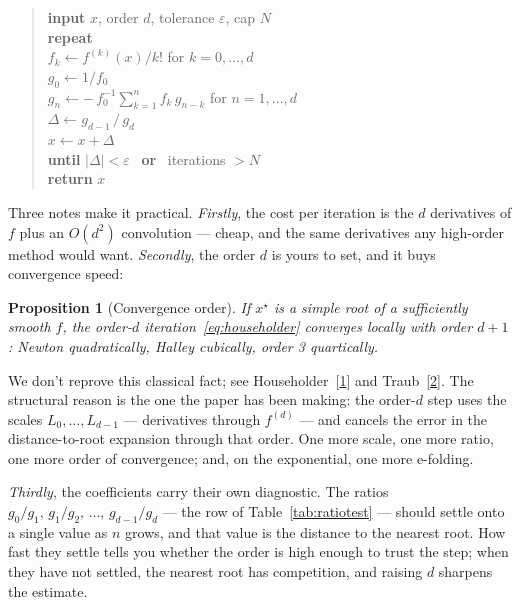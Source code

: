 \documentclass[11pt]{article}
\newtheorem{proposition}{Proposition}
\newcommand{\Lk}[1]{L_{#1}}             %
\newcommand{\order}{d}                  %
\begin{document}
\begin{quote}
\ttfamily
\textbf{input} $x$, order $\order$, tolerance $\varepsilon$, cap $N$\\[0.3em]
\textbf{repeat}\\
\hspace*{1.5em}$f_k \gets f^{(k)}(x)/k!$ \quad for $k=0,\dots,\order$\\
\hspace*{1.5em}$g_0 \gets 1/f_0$\\
\hspace*{1.5em}$g_n \gets -\,f_0^{-1}\textstyle\sum_{k=1}^{n} f_k\,g_{n-k}$ \quad for $n=1,\dots,\order$\\
\hspace*{1.5em}$\Delta \gets g_{\order-1}\,/\,g_\order$\\
\hspace*{1.5em}$x \gets x + \Delta$\\
\textbf{until} $|\Delta| < \varepsilon$ \ \textbf{or} \ iterations $> N$\\[0.3em]
\textbf{return} $x$
\end{quote}

Three notes make it practical. \emph{Firstly}, the cost per iteration is the $\order$
derivatives of $f$ plus an $O(\order^2)$ convolution --- cheap, and the same
derivatives any high-order method would want. \emph{Secondly}, the order $\order$ is
yours to set, and it buys convergence speed:

\begin{proposition}[Convergence order]
If $x^\star$ is a simple root of a sufficiently smooth $f$, the order-$\order$
iteration~\eqref{eq:householder} converges locally with order $\order+1$: Newton
quadratically, Halley cubically, order 3 quartically.
\label{prop:conv}
\end{proposition}

We don't reprove this classical fact; see Householder~[\hyperlink{ref:1}{1}] and
Traub~[\hyperlink{ref:2}{2}]. The structural reason is the one the paper has been
making: the order-$\order$ step uses the scales $\Lk{0},\dots,\Lk{\order-1}$ ---
derivatives through $f^{(\order)}$ --- and cancels the error in the
distance-to-root expansion through that order. One more scale, one more ratio, one
more order of convergence; and, on the exponential, one more e-folding.

\emph{Thirdly}, the coefficients carry their own diagnostic. The ratios
$g_0/g_1,\,g_1/g_2,\,\dots,\,g_{\order-1}/g_\order$ --- the row of
Table~\ref{tab:ratiotest} --- should settle onto a single value as $n$ grows, and that
value is the distance to the nearest root. How fast they settle tells you whether the
order is high enough to trust the step; when they have not settled, the nearest root
has competition, and raising $\order$ sharpens the estimate.
\end{document}
